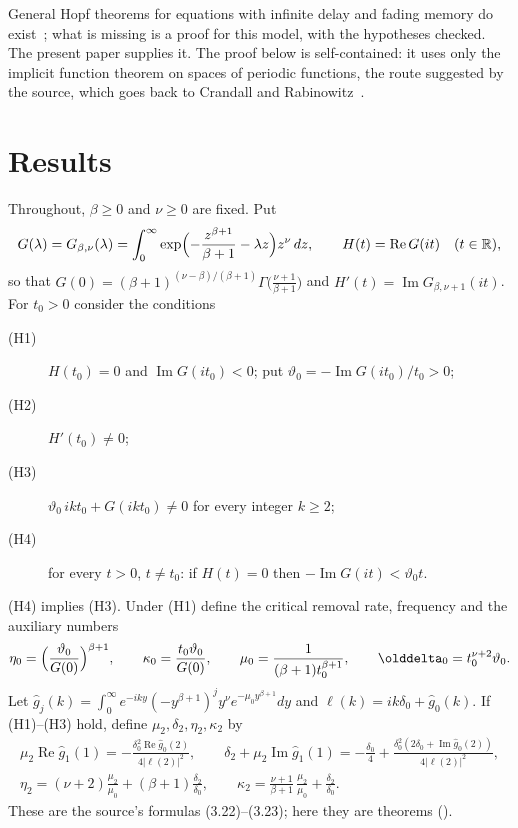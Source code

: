 \documentclass[11pt,a4paper]{report}
\newcommand{\vth}{\vartheta}
\newcommand{\gh}{\hat g}
\begin{document}
General Hopf theorems for equations with infinite delay and fading memory do exist~\autocite{Staffans1987}; what is missing is a proof for this model, with the hypotheses checked. The present paper supplies it. The proof below is self-contained: it uses only the implicit function theorem on spaces of periodic functions, the route suggested by the source, which goes back to Crandall and Rabinowitz~\autocite{CrandallRabinowitz1977}.

\section{Results}\label{sec:results}

Throughout, $\beta\ge0$ and $\nu\ge0$ are fixed. Put
\[
G(\lambda)=G_{\beta,\nu}(\lambda)=\int_0^\infty \exp\Bigl(-\frac{z^{\beta+1}}{\beta+1}-\lambda z\Bigr)z^\nu\,dz,\qquad
H(t)=\operatorname{Re}G(it)\quad(t\in\mathbb{R}),
\]
so that $G(0)=(\beta+1)^{(\nu-\beta)/(\beta+1)}\Gamma\bigl(\frac{\nu+1}{\beta+1}\bigr)$ and $H'(t)=\operatorname{Im}G_{\beta,\nu+1}(it)$. For $t_0>0$ consider the conditions
\begin{description}
\item[(H1)] $H(t_0)=0$ and $\operatorname{Im}G(it_0)<0$; put $\vth_0=-\operatorname{Im}G(it_0)/t_0>0$;
\item[(H2)] $H'(t_0)\neq0$;
\item[(H3)] $\vth_0\,ikt_0+G(ikt_0)\neq0$ for every integer $k\ge2$;
\item[(H4)] for every $t>0$, $t\ne t_0$: if $H(t)=0$ then $-\operatorname{Im}G(it)<\vth_0t$.
\end{description}
(H4) implies (H3). Under (H1) define the critical removal rate, frequency and the auxiliary numbers
\begin{equation}\label{eq:crit}
\eta_0=\Bigl(\frac{\vth_0}{G(0)}\Bigr)^{\beta+1},\qquad
\kappa_0=\frac{t_0\vth_0}{G(0)},\qquad
\mu_0=\frac{1}{(\beta+1)t_0^{\beta+1}},\qquad
\delta_0=t_0^{\nu+2}\vth_0 .
\end{equation}
Let $\gh_j(k)=\int_0^\infty e^{-iky}(-y^{\beta+1})^jy^\nu e^{-\mu_0y^{\beta+1}}dy$ and $\ell(k)=ik\delta_0+\gh_0(k)$. If (H1)--(H3) hold, define $\mu_2,\delta_2,\eta_2,\kappa_2$ by
\begin{gather}
\mu_2\operatorname{Re}\gh_1(1)=-\frac{\delta_0^2\operatorname{Re}\gh_0(2)}{4|\ell(2)|^2},\qquad
\delta_2+\mu_2\operatorname{Im}\gh_1(1)=-\frac{\delta_0}{4}+\frac{\delta_0^2(2\delta_0+\operatorname{Im}\gh_0(2))}{4|\ell(2)|^2},\label{eq:mu2}\\
\eta_2=(\nu+2)\frac{\mu_2}{\mu_0}+(\beta+1)\frac{\delta_2}{\delta_0},\qquad
\kappa_2=\frac{\nu+1}{\beta+1}\,\frac{\mu_2}{\mu_0}+\frac{\delta_2}{\delta_0}.\label{eq:eta2}
\end{gather}
These are the source's formulas (3.22)--(3.23); here they are theorems ().
\end{document}
